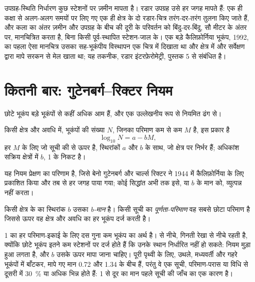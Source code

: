 उपग्रह-स्थिति निर्धारण कुछ स्टेशनों पर ज़मीन मापता है। रडार उपग्रह उसे हर जगह मापते हैं: एक ही कक्षा से अलग-अलग समयों पर लिए गए एक ही क्षेत्र के दो रडार-चित्र तरंग-दर-तरंग तुलना किए जाते हैं, और कला का अंतर ज़मीन और उपग्रह के बीच की दूरी के परिवर्तन को बिंदु-दर-बिंदु, सौ मीटर के अंतर पर, मानचित्रित करता है, बिना किसी पूर्व-स्थापित स्टेशन-जाल के। एक बड़े कैलिफ़ोर्निया भूकंप, 1992, का पहला ऐसा मानचित्र उसका सह-भूकंपीय विस्थापन एक चित्र में दिखाता था और क्षेत्र में और सर्वेक्षण द्वारा मापे सरकन से मेल खाता था; यह तकनीक, रडार इंटरफ़ेरोमेट्री, पुस्तक 5 से संबंधित है।

\section{कितनी बार: गुटेनबर्ग–रिक्टर नियम}\label{sec:b1:earthquake-source:gr}

छोटे भूकंप बड़े भूकंपों से कहीं अधिक आम हैं, और एक उल्लेखनीय रूप से नियमित ढंग से।

\begin{proposition}[गुटेनबर्ग–रिक्टर नियम]
\label{prop:b1:earthquake-source:gutenberg-richter}
किसी क्षेत्र और अवधि में, भूकंपों की संख्या $N$, जिनका परिमाण कम से कम $M$ है, इस प्रकार है
\[
  \log_{10} N = a - bM ,
\]
हर $M$ के लिए जो सूची की  से ऊपर है, स्थिरांकों $a$ और $b$ के साथ, जो क्षेत्र पर निर्भर हैं; अधिकांश सक्रिय क्षेत्रों में $b$, 1 के निकट है।
\end{proposition}
\admitted

यह नियम प्रेक्षण का परिणाम है, जिसे बेनो गुटेनबर्ग और चार्ल्स रिक्टर ने 1944 में कैलिफ़ोर्निया के लिए प्रकाशित किया और तब से हर जगह पाया गया; कोई सिद्धांत अभी तक इसे, या $b$ के मान को, व्युत्पन्न नहीं करता।

\begin{definition}[b-मान, पूर्णता-परिमाण]
\label{def:b1:earthquake-source:b-value}
किसी क्षेत्र के  का स्थिरांक $b$ उसका \emph{b-मान} है। किसी सूची का \emph{पूर्णता-परिमाण} वह सबसे छोटा परिमाण है जिससे ऊपर वह क्षेत्र और अवधि का हर भूकंप दर्ज करती है।
\end{definition}

1 का  हर परिमाण-इकाई के लिए दस गुना कम भूकंप का अर्थ है।  से नीचे, गिनती रेखा से नीचे रहती है, क्योंकि छोटे भूकंप इतने कम स्टेशनों पर दर्ज होते हैं कि उनके स्थान निर्धारित नहीं हो सकते: नियम मुड़ा हुआ लगता है, और $b$ उसके ऊपर मापा जाना चाहिए। पूरी पृथ्वी के लिए, उथले, मध्यवर्ती और गहरे भूकंपों में बाँटकर, मापे गए मान 0.72 और 1.34 के बीच हैं, परंतु वे एक सूची, परिमाण-परास या विधि से दूसरी में \qty{30}{\percent} या अधिक भिन्न होते हैं: 1 से दूर का मान पहले सूची की जाँच का एक कारण है।

